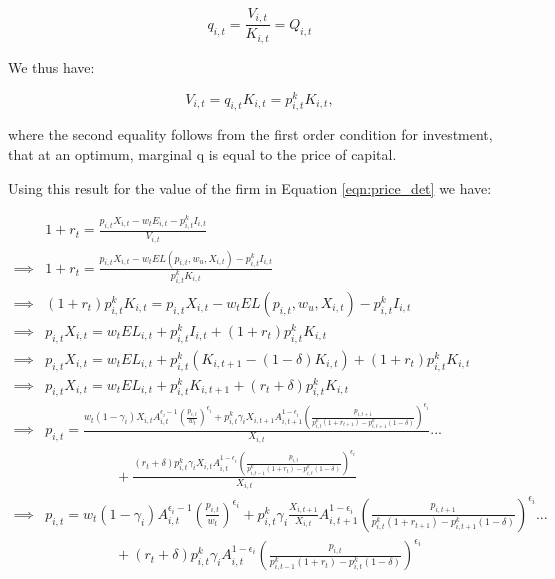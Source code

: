 \documentclass[letterpaper,12pt]{article}
\theoremstyle{definition}
\begin{document}
\begin{spacing}{1.5}
\begin{equation}
q_{i,t} = \frac{V_{i,t}}{K_{i,t}} = Q_{i,t} 
\end{equation}

We thus have:

\begin{equation}
\label{eqn:solve_v1}
V_{i,t} = q_{i,t}K_{i,t} =p^{k}_{i,t}K_{i,t},
\end{equation}

\noindent\noindent where the second equality follows from the first order condition for investment, that at an optimum, marginal q is equal to the price of capital.


Using this result for the value of the firm in Equation \ref{eqn:price_det} we have:

\begin{equation}
\label{eqn:price_det2}
\begin{split}
&  1+r_{t} = \frac{ p_{i,t}X_{i,t} - w_{t}E_{i,t} - p^{k}_{i,t}I_{i,t}}{V_{i,t}} \\
\implies & 1+r_{t} =  \frac{ p_{i,t}X_{i,t} - w_{t}EL(p_{i,t},w_{u},X_{i,t}) - p^{k}_{i,t}I_{i,t}}{p^{k}_{i,t}K_{i,t}} \\
\implies & (1+r_{t})p^{k}_{i,t}K_{i,t} =  p_{i,t}X_{i,t} - w_{t}EL(p_{i,t},w_{u},X_{i,t}) - p^{k}_{i,t}I_{i,t} \\
\implies & p_{i,t}X_{i,t} = w_{t}EL_{i,t} + p^{k}_{i,t}I_{i,t} +  (1+r_{t})p^{k}_{i,t}K_{i,t} \\
\implies & p_{i,t}X_{i,t} = w_{t}EL_{i,t}+ p^{k}_{i,t}(K_{i,t+1} - (1-\delta)K_{i,t}) +  (1+r_{t})p^{k}_{i,t}K_{i,t} \\
\implies & p_{i,t}X_{i,t} = w_{t}EL_{i,t} + p^{k}_{i,t}K_{i,t+1}+  (r_{t}+\delta)p^{k}_{i,t}K_{i,t} \\
\implies & p_{i,t}= \frac{w_{t}(1-\gamma_{i})X_{i,t}A_{i,t}^{\epsilon_{i}-1}\left( \frac{ p_{i,t}}{w_{t}}\right)^{\epsilon_{i}} + p^{k}_{i,t} \gamma_{i}X_{i,t+1}A_{i,t+1}^{1-\epsilon_{i}} \left(\frac{p_{i,t+1}}{p^{k}_{i,t}(1+r_{t+1}) - p^{k}_{i,t+1}(1-\delta)} \right)^{\epsilon_{i}}}{X_{i,t} } ... \\
& \quad\quad\quad\quad\quad + \frac{ (r_{t}+\delta)p^{k}_{i,t}\gamma_{i}X_{i,t}A_{i,t}^{1-\epsilon_{i}} \left(\frac{p_{i,t}}{p^{k}_{i,t-1}(1+r_{t}) - p^{k}_{i,t}(1-\delta)} \right)^{\epsilon_{i}}}{X_{i,t} } \\
\implies & p_{i,t}= w_{t}(1-\gamma_{i})A_{i,t}^{\epsilon_{i}-1}\left( \frac{ p_{i,t}}{w_{t}}\right)^{\epsilon_{i}} + p^{k}_{i,t} \gamma_{i}\frac{X_{i,t+1}}{X_{i,t}}A_{i,t+1}^{1-\epsilon_{i}} \left(\frac{p_{i,t+1}}{p^{k}_{i,t}(1+r_{t+1}) - p^{k}_{i,t+1}(1-\delta)} \right)^{\epsilon_{i}} ... \\
& \quad\quad\quad\quad\quad +  (r_{t}+\delta)p^{k}_{i,t}\gamma_{i}A_{i,t}^{1-\epsilon_{i}} \left(\frac{p_{i,t}}{p^{k}_{i,t-1}(1+r_{t}) - p^{k}_{i,t}(1-\delta)} \right)^{\epsilon_{i}}
\end{split}
\end{equation}


\end{spacing}
\end{document}
